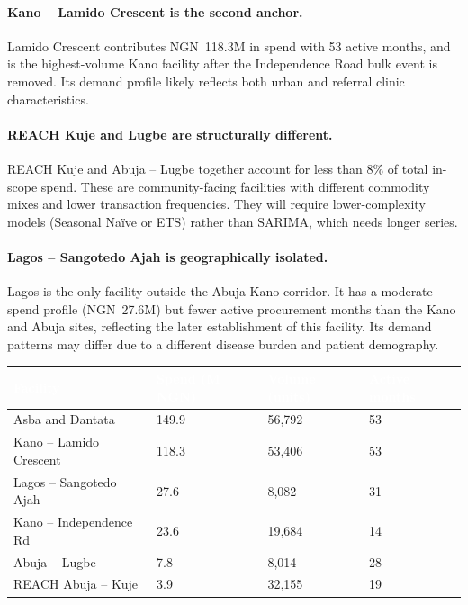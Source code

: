 \documentclass[12pt, a4paper]{article}
\begin{document}
\paragraph{Kano -- Lamido Crescent is the second anchor.}
Lamido Crescent contributes NGN~118.3M in spend with 53 active months,
and is the highest-volume Kano facility after the Independence Road
bulk event is removed. Its demand profile likely reflects both urban
and referral clinic characteristics.

\paragraph{REACH Kuje and Lugbe are structurally different.}
REACH Kuje and Abuja -- Lugbe together account for less than 8\% of
total in-scope spend. These are community-facing facilities with
different commodity mixes and lower transaction frequencies. They will
require lower-complexity models (Seasonal Na\"{i}ve or ETS) rather than
SARIMA, which needs longer series.

\paragraph{Lagos -- Sangotedo Ajah is geographically isolated.}
Lagos is the only facility outside the Abuja-Kano corridor. It has
a moderate spend profile (NGN~27.6M) but fewer active procurement months
than the Kano and Abuja sites, reflecting the later establishment of this
facility. Its demand patterns may differ due to a different disease burden
and patient demography.

\vspace{0.5em}
\noindent
\begin{tabularx}{\textwidth}{@{} L{4.5cm} R{2.3cm} R{2.3cm} C{2.3cm} @{}}
  \toprule
  \textcolor{white}{\textbf{Facility}} &
  \textcolor{white}{\textbf{Spend (M NGN)}} &
  \textcolor{white}{\textbf{Volume (units)}} &
  \textcolor{white}{\textbf{Active months}} \\
  \midrule
  Asba and Dantata        & 149.9 & 56,792 & 53 \\
  Kano -- Lamido Crescent & 118.3 & 53,406 & 53 \\
  Lagos -- Sangotedo Ajah & 27.6  & 8,082  & 31 \\
  Kano -- Independence Rd & 23.6  & 19,684 & 14 \\
  Abuja -- Lugbe          & 7.8   & 8,014  & 28 \\
  REACH Abuja -- Kuje     & 3.9   & 32,155 & 19 \\
  \bottomrule
\end{tabularx}
\vspace{0.3em}
\end{document}
